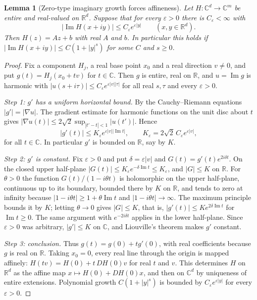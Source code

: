 \documentclass[11pt,a4paper]{article}
\newtheorem{lemma}[theorem]{Lemma}
\theoremstyle{remark}
\newcommand{\R}{\mathbb R}
\newcommand{\C}{\mathbb C}
\newcommand{\im}{\operatorname{Im}}
\begin{document}
\begin{lemma}[Zero-type imaginary growth forces affineness]\label{lem:growth}
Let $H:\C^d\to\C^m$ be entire and real-valued on $\R^d$. Suppose that
for every $\varepsilon>0$ there is $C_\varepsilon<\infty$ with
\begin{equation}\label{eq:zerotype}
 |\im H(x+iy)|\le C_\varepsilon e^{\varepsilon|y|}\qquad(x,y\in\R^d).
\end{equation}
Then $H(z)=Az+b$ with real $A$ and $b$. In particular this holds if
$|\im H(x+iy)|\le C(1+|y|^s)$ for some $C$ and $s\ge0$.
\end{lemma}

\begin{proof}
Fix a component $H_j$, a real base point $x_0$ and a real direction
$v\ne0$, and put $g(t)=H_j(x_0+tv)$ for $t\in\C$. Then $g$ is entire,
real on $\R$, and $u=\im g$ is harmonic with
$|u(s+i\tau)|\le C_\varepsilon e^{\varepsilon|v||\tau|}$ for all
real $s,\tau$ and every $\varepsilon>0$.

\emph{Step 1: $g'$ has a uniform horizontal bound.}
By the Cauchy--Riemann equations $|g'|=|\nabla u|$. The gradient
estimate for harmonic functions on the unit disc about $t$ gives
$|\nabla u(t)|\le 2\sqrt2\sup_{|t'-t|<1}|u(t')|$. Hence
\[
 |g'(t)|\le K_\varepsilon e^{\varepsilon|v||\im t|},\qquad
 K_\varepsilon=2\sqrt2\,C_\varepsilon e^{\varepsilon|v|},
\]
for all $t\in\C$. In particular $g'$ is bounded on $\R$, say by $K$.

\emph{Step 2: $g'$ is constant.}
Fix $\varepsilon>0$ and put $\delta=\varepsilon|v|$ and
$G(t)=g'(t)e^{2i\delta t}$. On the closed upper half-plane
$|G(t)|\le K_\varepsilon e^{-\delta\im t}\le K_\varepsilon$, and
$|G|\le K$ on $\R$. For $\theta>0$ the function $G(t)/(1-i\theta t)$
is holomorphic on the upper half-plane, continuous up to its boundary,
bounded there by $K$ on $\R$, and tends to zero at infinity because
$|1-i\theta t|\ge1+\theta\im t$ and $|1-i\theta t|\to\infty$. The
maximum principle bounds it by $K$; letting $\theta\to0$ gives
$|G|\le K$, that is, $|g'(t)|\le Ke^{2\delta\im t}$ for $\im t\ge0$.
The same argument with $e^{-2i\delta t}$ applies in the lower
half-plane. Since $\varepsilon>0$ was arbitrary, $|g'|\le K$ on $\C$,
and Liouville's theorem makes $g'$ constant.

\emph{Step 3: conclusion.}
Thus $g(t)=g(0)+tg'(0)$, with real coefficients because $g$ is real on
$\R$. Taking $x_0=0$, every real line through the origin is mapped
affinely: $H(tv)=H(0)+t\,DH(0)v$ for real $t$ and $v$. This determines
$H$ on $\R^d$ as the affine map $x\mapsto H(0)+DH(0)x$, and then on
$\C^d$ by uniqueness of entire extensions. Polynomial growth
$C(1+|y|^s)$ is bounded by $C_\varepsilon e^{\varepsilon|y|}$ for every
$\varepsilon>0$.
\end{proof}
\end{document}
